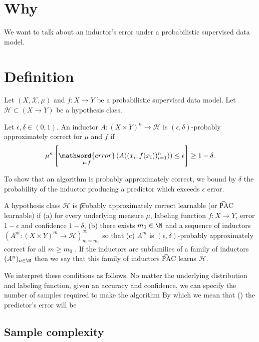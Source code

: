 

\section*{Why}

We want to talk about an inductor's error under a probabilistic supervised data model.

\section*{Definition}

Let $(X, \mathcal{X} , \mu )$ and $f: X \to Y$ be a probabilistic supervised data model.
Let $\mathcal{H}  \subset (X \to Y)$ be a hypothesis class.

Let $\epsilon ,\delta  \in (0, 1)$.
An inductor $A: (X \times  Y)^n \to \mathcal{H} $ is \t{$(\epsilon ,\delta )$-probably approximately correct} for $\mu $ and $f$ if
    \[
\mu ^{n}\left[
\underset{\mu , f}{\mathword{error}}\left(
A((x_i, f(x_i))_{i = 1}^{n})
\right) \leq \epsilon
\right] \geq 1 - \delta .
    \]

To show that an algorithm is probably approximately correct, we bound by $\delta $ the probability of the inductor producing a predictor which exceeds $\epsilon $ error.

A hypothesis class $\mathcal{H} $ is \t{probably approximately correct learnable} (or \t{PAC learnable}) if
(a) for every underlying measure $\mu $, labeling function $f: X \to Y$, error $1-\epsilon $ and confidence $1-\delta $, (b) there exists $m_0 \in \N  $ and a sequence of inductors $(A^m: (X \times Y)^{m} \to \mathcal{H} )_{m = m_0}^{\infty}$ so that (c) $A^m$ is $(\epsilon , \delta )$-probably approximately correct for all $m \geq m_0$ .
If the inductors are subfamilies of a family of inductors $(A^n)_{n \in \N  }$ then we say that this family of inductors \t{PAC learns} $\mathcal{H} $.

We interpret these conditions as follows.
No matter the underlying distribution and labeling function, given an accuracy and confidence, we can specify the number of samples required to make the algorithm 
By which we mean that () the predictor's error will be 

\subsection*{Sample complexity}

